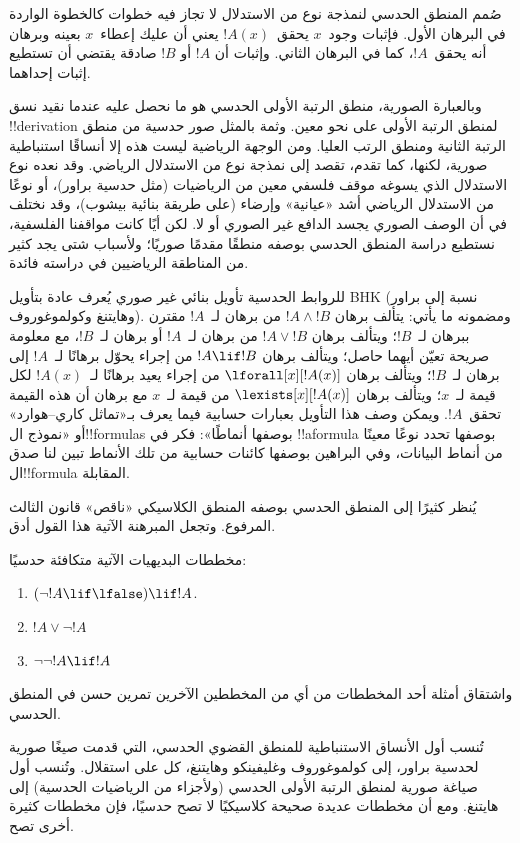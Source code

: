 \documentclass[../../../include/open-logic-section]{subfiles}
\begin{document}
صُمم المنطق الحدسي لنمذجة نوع من الاستدلال لا تجاز فيه خطوات كالخطوة
الواردة في البرهان الأول. فإثبات وجود~$x$ يحقق~$!A(x)$ يعني أن عليك
إعطاء~$x$ بعينه وبرهان أنه يحقق~$!A$، كما في البرهان الثاني. وإثبات
أن $!A$ أو $!B$ صادقة يقتضي أن تستطيع إثبات إحداهما.

وبالعبارة الصورية، منطق الرتبة الأولى الحدسي هو ما نحصل عليه عندما
نقيد نسق !!{derivation} لمنطق الرتبة الأولى على نحو معين. وثمة بالمثل
صور حدسية من منطق الرتبة الثانية ومنطق الرتب العليا. ومن الوجهة
الرياضية ليست هذه إلا أنساقًا استنباطية صورية، لكنها، كما تقدم، تقصد
إلى نمذجة نوع من الاستدلال الرياضي. وقد نعده نوع الاستدلال الذي يسوغه
موقف فلسفي معين من الرياضيات (مثل حدسية براور)، أو نوعًا من الاستدلال
الرياضي أشد «عيانية» وإرضاء (على طريقة بنائية بيشوب)، وقد نختلف في أن
الوصف الصوري يجسد الدافع غير الصوري أو لا. لكن أيًا كانت مواقفنا
الفلسفية، نستطيع دراسة المنطق الحدسي بوصفه منطقًا مقدمًا صوريًا؛
ولأسباب شتى يجد كثير من المناطقة الرياضيين في دراسته فائدة.

للروابط الحدسية تأويل بنائي غير صوري يُعرف عادة بتأويل BHK (نسبة إلى
براور وهايتنغ وكولموغوروف). ومضمونه ما يأتي: يتألف برهان $!A \land
!B$ من برهان لـ~$!A$ مقترن ببرهان لـ~$!B$؛ ويتألف برهان $!A \lor !B$
من برهان لـ~$!A$ أو برهان لـ~$!B$، مع معلومة صريحة تعيّن أيهما حاصل؛
ويتألف برهان $!A \lif !B$ من إجراء يحوّل برهانًا لـ~$!A$ إلى برهان
لـ~$!B$؛ ويتألف برهان $\lforall[x][!A(x)]$ من إجراء يعيد برهانًا
لـ~$!A(x)$ لكل قيمة لـ~$x$؛ ويتألف برهان $\lexists[x][!A(x)]$ من قيمة
لـ~$x$ مع برهان أن هذه القيمة تحقق~$!A$. ويمكن وصف هذا التأويل بعبارات
حسابية فيما يعرف بـ«تماثل كاري--هوارد» أو «نموذج ال!!{formula}s
بوصفها أنماطًا»: فكر في !!a{formula} بوصفها تحدد نوعًا معينًا من
أنماط البيانات، وفي البراهين بوصفها كائنات حسابية من تلك الأنماط تبين
لنا صدق ال!!{formula} المقابلة.

يُنظر كثيرًا إلى المنطق الحدسي بوصفه المنطق الكلاسيكي «ناقص» قانون
الثالث المرفوع. وتجعل المبرهنة الآتية هذا القول أدق.
\begin{thm}
مخططات البديهيات الآتية متكافئة حدسيًا:
\begin{enumerate}
\item $(\lnot !A \lif \lfalse) \lif !A$.
\item $!A \lor \lnot !A$
\item $\lnot \lnot !A \lif !A$
\end{enumerate}
\end{thm}
واشتقاق أمثلة أحد المخططات من أي من المخططين الآخرين تمرين حسن في
المنطق الحدسي.

تُنسب أول الأنساق الاستنباطية للمنطق القضوي الحدسي، التي قدمت صيغًا
صورية لحدسية براور، إلى كولموغوروف وغليفينكو وهايتنغ، كل على استقلال.
وتُنسب أول صياغة صورية لمنطق الرتبة الأولى الحدسي (ولأجزاء من
الرياضيات الحدسية) إلى هايتنغ. ومع أن مخططات عديدة صحيحة كلاسيكيًا لا
تصح حدسيًا، فإن مخططات كثيرة أخرى تصح.
\end{document}
